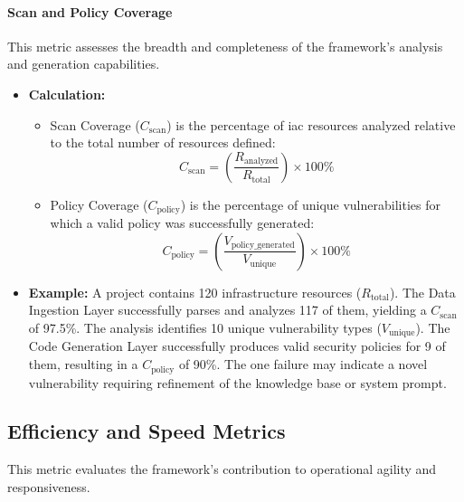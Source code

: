 \paragraph{Scan and Policy Coverage} This metric assesses the breadth and completeness of the framework's analysis and generation capabilities.
\begin{itemize}
    \item \textbf{Calculation:}
        \begin{itemize}
            \item Scan Coverage (\( C_{\text{scan}} \)) is the percentage of \gls{iac} resources analyzed relative to the total number of resources defined:
            \[ C_{\text{scan}} = \left(\frac{R_{\text{analyzed}}}{R_{\text{total}}}\right) \times 100\% \]
            \item Policy Coverage (\( C_{\text{policy}} \)) is the percentage of unique vulnerabilities for which a valid policy was successfully generated:
            \[ C_{\text{policy}} = \left(\frac{V_{\text{policy\_generated}}}{V_{\text{unique}}}\right) \times 100\% \]
        \end{itemize}
        \item \textbf{Example:} A project contains 120 infrastructure resources (\( R_{\text{total}} \)). The Data Ingestion Layer successfully parses and analyzes 117 of them, yielding a \( C_{\text{scan}} \) of 97.5\%. The analysis identifies 10 unique vulnerability types (\( V_{\text{unique}} \)). The Code Generation Layer successfully produces valid security policies for 9 of them, resulting in a \( C_{\text{policy}} \) of 90\%. The one failure may indicate a novel vulnerability requiring refinement of the knowledge base or system prompt.
\end{itemize}

\subsection*{Efficiency and Speed Metrics}
This metric evaluates the framework's contribution to operational agility and responsiveness.

